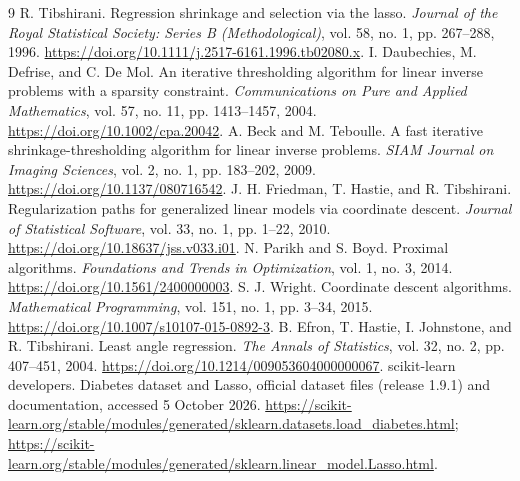 \documentclass[11pt,a4paper]{article}
\begin{document}
\begin{thebibliography}{9}
R. Tibshirani. Regression shrinkage and selection via the lasso.
\emph{Journal of the Royal Statistical Society: Series B (Methodological)},
vol. 58, no. 1, pp. 267--288, 1996.
\url{https://doi.org/10.1111/j.2517-6161.1996.tb02080.x}.
I. Daubechies, M. Defrise, and C. De Mol.
An iterative thresholding algorithm for linear inverse problems with a sparsity constraint.
\emph{Communications on Pure and Applied Mathematics},
vol. 57, no. 11, pp. 1413--1457, 2004.
\url{https://doi.org/10.1002/cpa.20042}.
A. Beck and M. Teboulle.
A fast iterative shrinkage-thresholding algorithm for linear inverse problems.
\emph{SIAM Journal on Imaging Sciences}, vol. 2, no. 1, pp. 183--202, 2009.
\url{https://doi.org/10.1137/080716542}.
J. H. Friedman, T. Hastie, and R. Tibshirani.
Regularization paths for generalized linear models via coordinate descent.
\emph{Journal of Statistical Software}, vol. 33, no. 1, pp. 1--22, 2010.
\url{https://doi.org/10.18637/jss.v033.i01}.
N. Parikh and S. Boyd. Proximal algorithms.
\emph{Foundations and Trends in Optimization}, vol. 1, no. 3, 2014.
\url{https://doi.org/10.1561/2400000003}.
S. J. Wright. Coordinate descent algorithms.
\emph{Mathematical Programming}, vol. 151, no. 1, pp. 3--34, 2015.
\url{https://doi.org/10.1007/s10107-015-0892-3}.
B. Efron, T. Hastie, I. Johnstone, and R. Tibshirani.
Least angle regression. \emph{The Annals of Statistics},
vol. 32, no. 2, pp. 407--451, 2004.
\url{https://doi.org/10.1214/009053604000000067}.
scikit-learn developers. Diabetes dataset and Lasso,
official dataset files (release 1.9.1) and documentation, accessed 5 October 2026.
\url{https://scikit-learn.org/stable/modules/generated/sklearn.datasets.load_diabetes.html};
\url{https://scikit-learn.org/stable/modules/generated/sklearn.linear_model.Lasso.html}.
\end{thebibliography}
\end{document}
